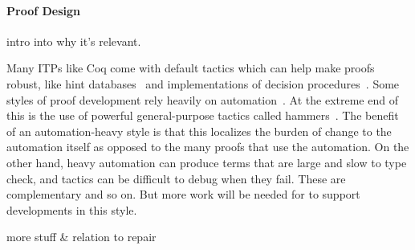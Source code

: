 \paragraph{Proof Design}

intro into why it's relevant.

Many ITPs like Coq come with default tactics which can
help make proofs robust, like hint databases~\cite{coq-intro} and implementations of decision procedures~\cite{Pugh1991}. 
Some styles of proof development rely heavily on automation~\cite{Chlipala:2013:CPD:2584504}.
At the extreme end of this is the use of powerful general-purpose tactics 
called hammers~\cite{Blanchette2016b, Blanchette2013, Kaliszyk2014, Czajka2018}.
The benefit of an automation-heavy style is that this localizes the burden of change to the automation itself as opposed 
to the many proofs that use the automation.
On the other hand, heavy automation can produce terms that are large and slow to type check,
and tactics can be difficult to debug when they fail.
These are complementary and so on.
But more work will be needed for \toolname to support developments in this style.

more stuff \& relation to repair




